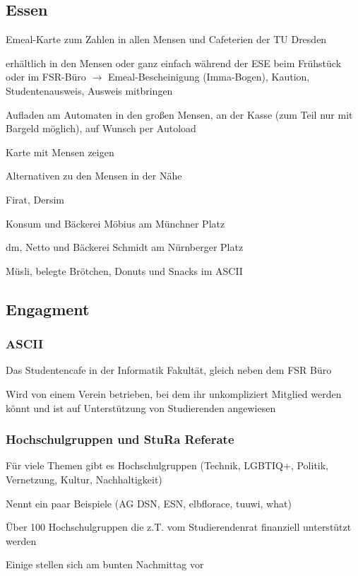 \documentclass[a4paper,12pt]{report}
\begin{document}
\subsection{Essen}
\begin{itemize*}
	\item Emeal-Karte zum Zahlen in allen Mensen und Cafeterien der TU Dresden
	\item erhältlich in den Mensen oder ganz einfach während der ESE beim Frühstück oder im FSR-Büro
	$\rightarrow$ Emeal-Bescheinigung (Imma-Bogen),  Kaution, Studentenausweis, Ausweis mitbringen
	\item Aufladen am Automaten in den großen Mensen, an der Kasse (zum Teil nur mit Bargeld möglich), auf Wunsch per Autoload
	\item Karte mit Mensen zeigen
	\item Alternativen zu den Mensen in der Nähe
	\begin{itemize*}
		\item Firat, Dersim
		\item Konsum und Bäckerei Möbius am Münchner Platz
		\item dm, Netto und Bäckerei Schmidt am Nürnberger Platz
		\item Müsli, belegte Brötchen, Donuts und Snacks im ASCII
	\end{itemize*}
\end{itemize*}

\subsection{Engagment}

\subsubsection{ASCII}
\begin{itemize*}
	\item Das Studentencafe in der Informatik Fakultät, gleich neben dem FSR Büro
	\item Wird von einem Verein betrieben, bei dem ihr unkompliziert Mitglied werden könnt und ist auf Unterstützung von Studierenden angewiesen
\end{itemize*}

\subsubsection{Hochschulgruppen und StuRa Referate}
\begin{itemize*}
	\item Für viele Themen gibt es Hochschulgruppen (Technik, LGBTIQ+, Politik, Vernetzung, Kultur, Nachhaltigkeit)
	\item Nennt ein paar Beispiele (AG DSN, ESN, elbflorace, tuuwi, what)
	\item Über 100 Hochschulgruppen die z.T. vom Studierendenrat finanziell unterstützt werden
	\item Einige stellen sich am bunten Nachmittag vor
\end{itemize*}
\end{document}
